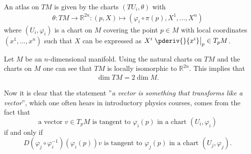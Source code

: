 

    \begin{property}
        An atlas on $TM$ is given by the charts $(TU_i,\theta)$ with
        \begin{gather}
            \theta:TM\rightarrow\mathbb{R}^{2n}:(p, X)\mapsto(\varphi_i\circ\pi(p),X^1,\ldots,X^n)
        \end{gather}
        where $(U_i,\varphi_i)$ is a chart on $M$ covering the point $p\in M$ with local coordinates $(x^1,\ldots,x^n)$ such that $X$ can be expressed as $X^i\left.\pderiv{}{x^i}\right|_p\in T_pM$.
    \end{property}

    \begin{property}[Dimension]
        Let $M$ be an $n$-dimensional manifold. Using the natural charts on $TM$ and the charts on $M$ one can see that $TM$ is locally isomorphic to $\mathbb{R}^{2n}$. This implies that
        \begin{gather}
            \dim TM = 2\dim M.
        \end{gather}
    \end{property}

    \begin{remark}
        Now it is clear that the statement ''\textit{a vector is something that transforms like a vector}'', which one often hears in introductory physics courses, comes from the fact that \[\text{a vector }v\in T_pM\text{ is tangent to }\varphi_i(p)\text{ in a chart }(U_i,\varphi_i)\] if and only if \[D(\varphi_j\circ\varphi_i^{-1})(\varphi_i(p))v\text{ is tangent to }\varphi_j(p)\text{ in a chart }(U_j,\varphi_j).\]
    \end{remark}

